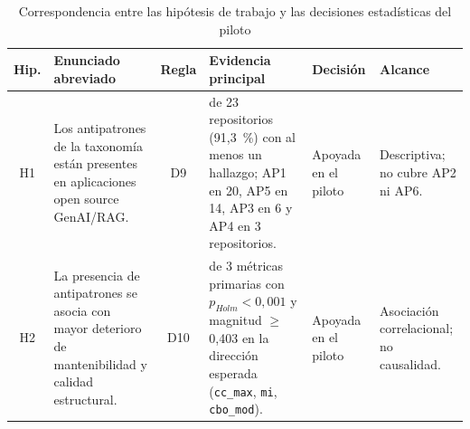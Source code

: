 \begin{table}[t]
\centering
\scriptsize
\setlength{\tabcolsep}{4pt}
\caption{Correspondencia entre las hipótesis de trabajo y las decisiones estadísticas del piloto}
\label{tab:hipotesis}
\begin{tabularx}{\textwidth}{@{}c >{\raggedright\arraybackslash}p{3.4cm} c >{\raggedright\arraybackslash}X >{\raggedright\arraybackslash}p{2.2cm} >{\raggedright\arraybackslash}p{2.6cm}@{}}
\toprule
\textbf{Hip.} & \textbf{Enunciado abreviado} & \textbf{Regla} & \textbf{Evidencia principal} & \textbf{Decisión} & \textbf{Alcance} \\
\midrule
H1 & Los antipatrones de la taxonomía están presentes en aplicaciones open source GenAI/RAG. & D9 & 21 de 23 repositorios (91,3~\%) con al menos un hallazgo; AP1 en 20, AP5 en 14, AP3 en 6 y AP4 en 3 repositorios. & Apoyada en el piloto & Descriptiva; no cubre AP2 ni AP6. \\
H2 & La presencia de antipatrones se asocia con mayor deterioro de mantenibilidad y calidad estructural. & D10 & 3 de 3 métricas primarias con $p_{Holm}<0{,}001$ y magnitud $\geq$ 0,403 en la dirección esperada (\texttt{cc\_max}, \texttt{mi}, \texttt{cbo\_mod}). & Apoyada en el piloto & Asociación correlacional; no causalidad. \\
\bottomrule
\end{tabularx}
\end{table}